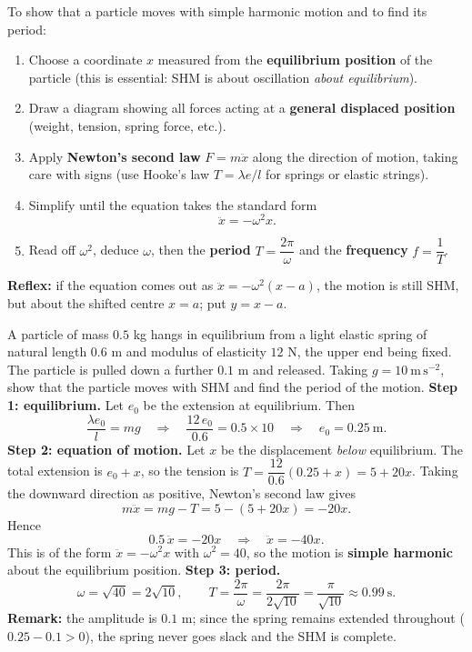 \documentclass[11pt]{article}
\newcommand{\cle}[1]{{\popxbold\color{popdark}#1}}
\begin{document}
\begin{methode}
To show that a particle moves with simple harmonic motion and to find its period:
\begin{enumerate}
\item Choose a \cle{coordinate} $x$ measured from the \textbf{equilibrium position} of the particle (this is essential: SHM is about oscillation \emph{about equilibrium}).
\item Draw a diagram showing all forces acting at a \textbf{general displaced position} (weight, tension, spring force, etc.).
\item Apply \textbf{Newton's second law} $F = m\ddot{x}$ along the direction of motion, taking care with signs (use Hooke's law $T = \lambda e / l$ for springs or elastic strings).
\item Simplify until the equation takes the standard form
\[ \ddot{x} = -\omega^{2} x . \]
\item Read off $\omega^{2}$, deduce $\omega$, then the \textbf{period} $T = \dfrac{2\pi}{\omega}$ and the \textbf{frequency} $f = \dfrac{1}{T}$.
\end{enumerate}
\textbf{Reflex:} if the equation comes out as $\ddot{x} = -\omega^{2}(x - a)$, the motion is still SHM, but about the shifted centre $x = a$; put $y = x - a$.
\end{methode}

\begin{exoresolu}
A particle of mass $0.5$ kg hangs in equilibrium from a light elastic spring of natural length $0.6$ m and modulus of elasticity $12$ N, the upper end being fixed. The particle is pulled down a further $0.1$ m and released. Taking $g = 10\ \mathrm{m\,s^{-2}}$, show that the particle moves with SHM and find the period of the motion.
\tcblower
\textbf{Step 1: equilibrium.} Let $e_{0}$ be the extension at equilibrium. Then
\[ \frac{\lambda e_{0}}{l} = mg \quad\Longrightarrow\quad \frac{12\,e_{0}}{0.6} = 0.5 \times 10 \quad\Longrightarrow\quad e_{0} = 0.25\ \mathrm{m}. \]
\textbf{Step 2: equation of motion.} Let $x$ be the displacement \emph{below} equilibrium. The total extension is $e_{0} + x$, so the tension is $T = \dfrac{12}{0.6}(0.25 + x) = 5 + 20x$. Taking the downward direction as positive, Newton's second law gives
\[ m\ddot{x} = mg - T = 5 - (5 + 20x) = -20x . \]
Hence
\[ 0.5\,\ddot{x} = -20x \quad\Longrightarrow\quad \ddot{x} = -40x . \]
This is of the form $\ddot{x} = -\omega^{2}x$ with $\omega^{2} = 40$, so the motion is \textbf{simple harmonic} about the equilibrium position.
\textbf{Step 3: period.}
\[ \omega = \sqrt{40} = 2\sqrt{10}, \qquad T = \frac{2\pi}{\omega} = \frac{2\pi}{2\sqrt{10}} = \frac{\pi}{\sqrt{10}} \approx 0.99\ \mathrm{s}. \]
\textbf{Remark:} the amplitude is $0.1$ m; since the spring remains extended throughout ($0.25 - 0.1 > 0$), the spring never goes slack and the SHM is complete.
\end{exoresolu}
\end{document}
